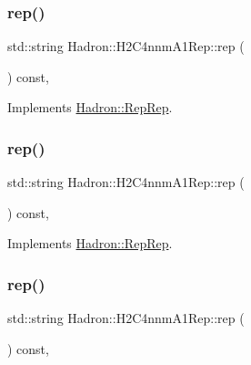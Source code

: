 \subsubsection{\texorpdfstring{rep()}{rep()}\hspace{0.1cm}{\footnotesize\ttfamily [1/3]}}
{\footnotesize\ttfamily std\+::string Hadron\+::\+H2\+C4nnm\+A1\+Rep\+::rep (\begin{DoxyParamCaption}{ }\end{DoxyParamCaption}) const\hspace{0.3cm}{\ttfamily [inline]}, {\ttfamily [virtual]}}



Implements \mbox{\hyperlink{structHadron_1_1RepRep_ab3213025f6de249f7095892109575fde}{Hadron\+::\+Rep\+Rep}}.

\mbox{\label{structHadron_1_1H2C4nnmA1Rep_ab84ffb9381f49b933c6c3fdf5936fa92}} 
\subsubsection{\texorpdfstring{rep()}{rep()}\hspace{0.1cm}{\footnotesize\ttfamily [2/3]}}
{\footnotesize\ttfamily std\+::string Hadron\+::\+H2\+C4nnm\+A1\+Rep\+::rep (\begin{DoxyParamCaption}{ }\end{DoxyParamCaption}) const\hspace{0.3cm}{\ttfamily [inline]}, {\ttfamily [virtual]}}



Implements \mbox{\hyperlink{structHadron_1_1RepRep_ab3213025f6de249f7095892109575fde}{Hadron\+::\+Rep\+Rep}}.

\mbox{\label{structHadron_1_1H2C4nnmA1Rep_ab84ffb9381f49b933c6c3fdf5936fa92}} 
\subsubsection{\texorpdfstring{rep()}{rep()}\hspace{0.1cm}{\footnotesize\ttfamily [3/3]}}
{\footnotesize\ttfamily std\+::string Hadron\+::\+H2\+C4nnm\+A1\+Rep\+::rep (\begin{DoxyParamCaption}{ }\end{DoxyParamCaption}) const\hspace{0.3cm}{\ttfamily [inline]}, {\ttfamily [virtual]}}



